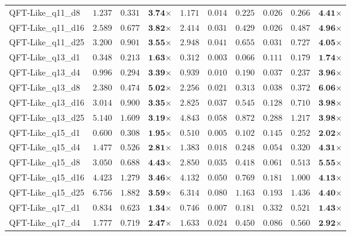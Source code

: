 \begin{table*}[t]
{\begin{tabular}{| l || r r c || r r r r r c |}
QFT-Like\_q11\_d8 & $1.237$ & $0.331$ & $\textbf{3.74}$$\times$ & $1.171$ & $0.014$ & $0.225$ & $0.026$ & $0.266$ & $\textbf{4.41}$$\times$ \\
QFT-Like\_q11\_d16 & $2.589$ & $0.677$ & $\textbf{3.82}$$\times$ & $2.414$ & $0.031$ & $0.429$ & $0.026$ & $0.487$ & $\textbf{4.96}$$\times$ \\
QFT-Like\_q11\_d25 & $3.200$ & $0.901$ & $\textbf{3.55}$$\times$ & $2.948$ & $0.041$ & $0.655$ & $0.031$ & $0.727$ & $\textbf{4.05}$$\times$ \\
QFT-Like\_q13\_d1 & $0.348$ & $0.213$ & $\textbf{1.63}$$\times$ & $0.312$ & $0.003$ & $0.066$ & $0.111$ & $0.179$ & $\textbf{1.74}$$\times$ \\
QFT-Like\_q13\_d4 & $0.996$ & $0.294$ & $\textbf{3.39}$$\times$ & $0.939$ & $0.010$ & $0.190$ & $0.037$ & $0.237$ & $\textbf{3.96}$$\times$ \\
QFT-Like\_q13\_d8 & $2.380$ & $0.474$ & $\textbf{5.02}$$\times$ & $2.256$ & $0.021$ & $0.313$ & $0.038$ & $0.372$ & $\textbf{6.06}$$\times$ \\
QFT-Like\_q13\_d16 & $3.014$ & $0.900$ & $\textbf{3.35}$$\times$ & $2.825$ & $0.037$ & $0.545$ & $0.128$ & $0.710$ & $\textbf{3.98}$$\times$ \\
QFT-Like\_q13\_d25 & $5.140$ & $1.609$ & $\textbf{3.19}$$\times$ & $4.843$ & $0.058$ & $0.872$ & $0.288$ & $1.217$ & $\textbf{3.98}$$\times$ \\
QFT-Like\_q15\_d1 & $0.600$ & $0.308$ & $\textbf{1.95}$$\times$ & $0.510$ & $0.005$ & $0.102$ & $0.145$ & $0.252$ & $\textbf{2.02}$$\times$ \\
QFT-Like\_q15\_d4 & $1.477$ & $0.526$ & $\textbf{2.81}$$\times$ & $1.383$ & $0.018$ & $0.248$ & $0.054$ & $0.320$ & $\textbf{4.31}$$\times$ \\
QFT-Like\_q15\_d8 & $3.050$ & $0.688$ & $\textbf{4.43}$$\times$ & $2.850$ & $0.035$ & $0.418$ & $0.061$ & $0.513$ & $\textbf{5.55}$$\times$ \\
QFT-Like\_q15\_d16 & $4.423$ & $1.279$ & $\textbf{3.46}$$\times$ & $4.132$ & $0.050$ & $0.769$ & $0.181$ & $1.000$ & $\textbf{4.13}$$\times$ \\
QFT-Like\_q15\_d25 & $6.756$ & $1.882$ & $\textbf{3.59}$$\times$ & $6.314$ & $0.080$ & $1.163$ & $0.193$ & $1.436$ & $\textbf{4.40}$$\times$ \\
QFT-Like\_q17\_d1 & $0.834$ & $0.623$ & $\textbf{1.34}$$\times$ & $0.746$ & $0.007$ & $0.181$ & $0.332$ & $0.521$ & $\textbf{1.43}$$\times$ \\
QFT-Like\_q17\_d4 & $1.777$ & $0.719$ & $\textbf{2.47}$$\times$ & $1.633$ & $0.024$ & $0.450$ & $0.086$ & $0.560$ & $\textbf{2.92}$$\times$ \\

\end{tabular}}
\end{table*}
